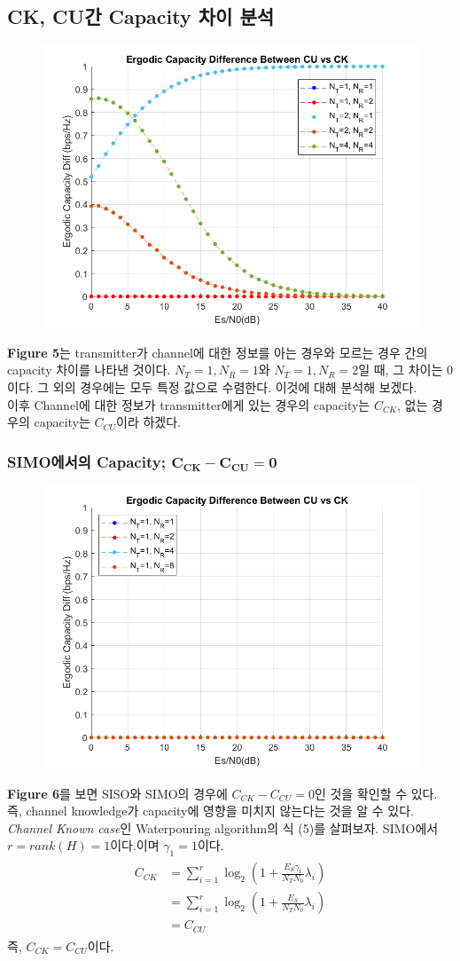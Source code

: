 \documentclass{article}
\newcommand{\bd}{\textbf} %
\begin{document}
\subsection{CK, CU간 Capacity 차이 분석}
\begin{figure}[H]
	\centering
	\includegraphics[width=.5\textwidth]{ergodic_diff.png}
	\caption{}
\end{figure}
\bd{Figure 5}는 transmitter가 channel에 대한 정보를 아는 경우와 모르는 경우 간의 capacity 차이를 나타낸 것이다.
$N_T=1, N_R=1$와 $N_T=1, N_R=2$일 때, 그 차이는 0이다. 그 외의 경우에는 모두 특정 값으로 수렴한다. 이것에 대해 분석해 보겠다.\\
이후 Channel에 대한 정보가 transmitter에게 있는 경우의 capacity는 $C_{CK}$, 없는 경우의 capacity는 $C_{CU}$이라 하겠다.

\subsubsection{SIMO에서의 Capacity; $\boldsymbol{C_{CK}-C_{CU}=0}$}
\begin{figure}[H]
	\centering
	\includegraphics[width=.5\textwidth]{ergodic_simo.png}
	\caption{}
\end{figure}
\bd{Figure 6}를 보면 SISO와 SIMO의 경우에 $C_{CK}-C_{CU}=0$인 것을 확인할 수 있다. 즉, channel knowledge가 capacity에 영향을 미치지 않는다는 것을 알 수 있다.\\
\textsl{Channel Known case}인 Waterpouring algorithm의 식 (5)를 살펴보자. SIMO에서 $r=rank(H)=1$이다.이며 $\gamma_1=1$이다.
\begin{gather}
\begin{split}
C_{CK} &=\sum_{i=1}^r\log_2 (1+\frac{E_S\gamma_i}{N_T N_0}\lambda_i)\\
&=\sum_{i=1}^r\log_2 (1+\frac{E_S}{N_T N_0}\lambda_i)\\
&=C_{CU}
\end{split}
\end{gather}
즉, $C_{CK}=C_{CU}$이다.
\end{document}
